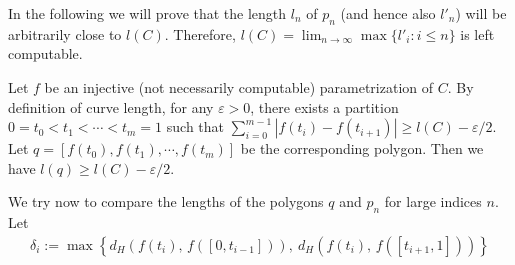 \documentclass{LMCS}
\theoremstyle{plain}
\begin{document}
In the following we will prove that the length $l_n$ of $p_n$ (and hence also $l'_n$) will be  arbitrarily close to $l(C)$. Therefore, $l(C) = \lim_{n\to\infty} \max\{l'_i: i\le n\}$ is left computable.

Let $f$ be an injective (not necessarily computable) parametrization of $C$. By definition of curve length, for any $\varepsilon >0$, there exists a partition $0=t_0<t_1<\cdots < t_m=1$ such that $\sum_{i=0}^{m-1} \left| f(t_i)-f(t_{i+1})\right| \ge l(C) -\varepsilon/2$. Let $q =[f(t_0), f(t_1), \cdots, f(t_m)]$ be the corresponding polygon. Then we have $l(q) \ge l(C)-\varepsilon/2$.

We try now to compare the lengths of the polygons $q$ and $p_n$ for large indices $n$. Let
\begin{eqnarray*}
\delta_i := \max\left\{d_H(f(t_i),\, f([0, t_{i-1}])),\ d_H(f(t_i),\, f([t_{i+1}, 1]))\right\}
\end{eqnarray*}
\end{document}
